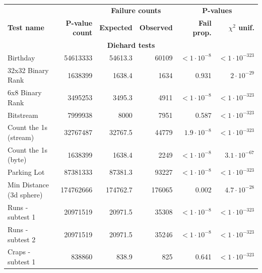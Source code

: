 \documentclass[
	digital,    %
	oneside,    %
	color,
	11pt,
	nocover,
	notable,
	nolof,
	nolot,
]{fithesis3}
\newcommand{\rd}{\cellcolor{red!40}}
\theoremstyle{definition}
\theoremstyle{remark}
\begin{document}
\begin{table}
\begin{nomar}
\centering
\scalebox{.85}
{
\begin{tabular}{@{}lrrrrr@{}} \toprule
                               &                   & \multicolumn{2}{c}{\textbf{Failure counts}} & \multicolumn{2}{c}{\textbf{P-values}} \\ \cmidrule(lr){3-4} \cmidrule(lr){5-6}
\textbf{Test name}             & \textbf{P-value count}     & \textbf{Expected}      & \textbf{Observed}      & \textbf{Fail prop.}        & \textbf{$\chi^2$ unif.}      \\ \midrule
\multicolumn{6}{c}{\textbf{Diehard tests}} \\ \midrule
Birthday                       & 54613333          & 54613.3       & 60109         & $<1\cdot 10^{-8}$  \rd & $<1\cdot 10^{-323}$   \rd \\
32x32 Binary Rank              & 1638399           & 1638.4        & 1634          & 0.931                  & $2 \cdot 10^{-29}$    \rd \\
6x8 Binary Rank                & 3495253           & 3495.3        & 4911          & $<1\cdot 10^{-8}$  \rd & $<1\cdot 10^{-323}$   \rd \\
Bitstream                      & 7999938           & 8000          & 7951          & 0.587                  & $<1\cdot 10^{-323}$   \rd \\
Count the 1s (stream)          & 32767487          & 32767.5       & 44779         & $1.9\cdot 10^{-8}$ \rd & $<1\cdot 10^{-323}$   \rd \\
Count the 1s (byte)            & 1638399           & 1638.4        & 2249          & $<1\cdot 10^{-8}$  \rd & $3.1 \cdot 10^{-67}$  \rd \\
Parking Lot                    & 87381333          & 87381.3       & 93227         & $<1\cdot 10^{-8}$  \rd & $<1\cdot 10^{-323}$   \rd \\
Min Distance (3d sphere)       & 174762666         & 174762.7      & 176065        & 0.002                  & $4.7 \cdot 10^{-28}$  \rd \\
Runs - subtest 1               & 20971519          & 20971.5       & 35308         & $<1\cdot 10^{-8}$  \rd & $<1\cdot 10^{-323}$   \rd \\
Runs - subtest 2               & 20971519          & 20971.5       & 35246         & $<1\cdot 10^{-8}$  \rd & $<1\cdot 10^{-323}$   \rd \\
Craps - subtest 1              & 838860            & 838.9         & 825           & 0.641                  & $<1\cdot 10^{-323}$   \rd \\ \midrule

\end{tabular}}
\end{nomar}
\end{table}
\end{document}
